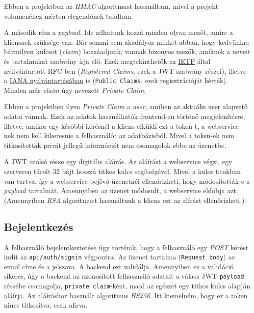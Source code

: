 \documentclass[a4paper,12pt]{thesis-ekf}
\theoremstyle{definition}
\begin{document}
			Ebben a projektben az \emph{HMAC} algoritmust használtam, mivel a projekt volumenéhez mérten elegendőnek találtam.
			
			A második rész a \emph{payload}. Ide adhatunk hozzá minden olyan mezőt, amire a kliensnek szüksége van. Bár semmi sem akadályoz minket abban, hogy kedvünkre bármilyen kulcsot (\emph{claim}) hozzáadjunk, vannak bizonyos mezők, amiknek a neveit és tartalmukat szabvány írja elő. Ezek megtekinthetők az \href{https://datatracker.ietf.org/doc/html/rfc7519#section-4.1}{IETF} által nyilvántartott RFC-ben (\emph{Registered Claims}, ezek a JWT szabvány részei), illetve a \href{https://www.iana.org/assignments/jwt/jwt.xhtml}{IANA nyilvántartásában} is (\verb|Public Claims|, ezek regisztrációját kérték). 
			Minden más \emph{claim} úgy nevezett \emph{Private Claim}.\cite{jwt-intro}
			
			Ebben a projektben ilyen \emph{Private Claim} a \emph{user}, amiben az aktuális user alapvető adatai vannak. Ezek az adatok használhatók frontend-en történő megjelenítésre, illetve, amikor egy későbbi kérésnél a kliens elküldi ezt a token-t, a webservice-nek nem kell kikeresnie a felhasználót az adatbázisból. Mivel a token-ek nem titkosítottak privát jellegű információt nem csomagolok ebbe az üzenetbe.
			
			A JWT utolsó része egy digitális aláírás. Az aláírást a webservice végzi, egy szerveren tárolt 32 bájt hosszú titkos kulcs segítségével. Mivel a kulcs titokban van tartva, így a webservice bejövő üzenetnél ellenőrizheti, hogy módosították-e a \emph{payload} tartalmát. Amennyiben az üzenet módosult, a webservice eldobja azt.
			(Amennyiben \emph{RSA} algoritmust használtunk a kliens ezt az alírást ellenőrizheti.)\cite{jwt-handbook}
			
			\subsection{Bejelentkezés}
    			A felhasználó bejelentkeztetése úgy történik, hogy a felhasználó egy \emph{POST} kérést indít az \verb|api/auth/signin| végpontra. Az üzenet tartalma (\verb|Request body|) az email címe és a jelszava. A backend ezt validálja. Amennyiben ez a validáció sikeres, úgy a backend az azonosított felhasználó adatait a válasz JWT \verb|payload| részébe csomagolja, \verb|private claim|-ként, majd az egészet egy titkos kulcs alapján aláírja.\cite{jwt-workflow} Az aláíráshoz használt algoritmus \emph{HS256}. 
    			Itt kiemelném, hogy ez a token nincs titkosítva, csak alírva.
    			
\end{document}
